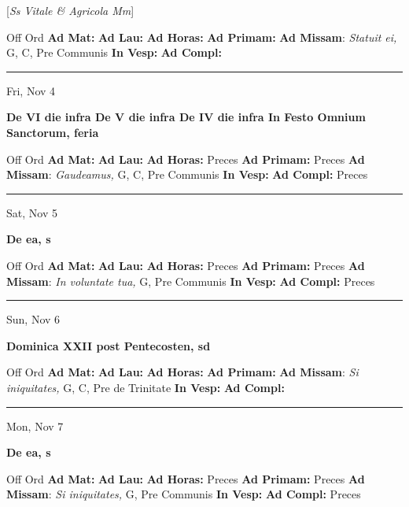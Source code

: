 \documentclass[letterpaper, 10pt]{article}
\begin{document}
[\textit{Ss Vitale \& Agricola Mm}]
\begin{justify}
Off Ord
\textbf{Ad Mat: }
\textbf{Ad Lau: }
\textbf{Ad Horas: }
\textbf{Ad Primam: }
\textbf{Ad Missam}: \textit{Statuit ei,} G, C, Pre Communis
\textbf{In Vesp: }
\textbf{Ad Compl: }\end{justify}



\hrule
\begin{center}
Fri, Nov 4
\end{center}\textbf{ \large De VI die infra De V die infra De IV die infra In Festo Omnium Sanctorum, \textnormal{\normalsize feria}}
\begin{justify}
Off Ord
\textbf{Ad Mat: }
\textbf{Ad Lau: }
\textbf{Ad Horas: }Preces
\textbf{Ad Primam: }Preces
\textbf{Ad Missam}: \textit{Gaudeamus,} G, C, Pre Communis
\textbf{In Vesp: }
\textbf{Ad Compl: }Preces\end{justify}



\hrule
\begin{center}
Sat, Nov 5
\end{center}\textbf{ \large De ea, \textnormal{\normalsize s}}
\begin{justify}
Off Ord
\textbf{Ad Mat: }
\textbf{Ad Lau: }
\textbf{Ad Horas: }Preces
\textbf{Ad Primam: }Preces
\textbf{Ad Missam}: \textit{In voluntate tua,} G, Pre Communis
\textbf{In Vesp: }
\textbf{Ad Compl: }Preces\end{justify}



\hrule
\begin{center}
Sun, Nov 6
\end{center}\textbf{ \large Dominica XXII post Pentecosten, \textnormal{\normalsize sd}}
\begin{justify}
Off Ord
\textbf{Ad Mat: }
\textbf{Ad Lau: }
\textbf{Ad Horas: }
\textbf{Ad Primam: }
\textbf{Ad Missam}: \textit{Si iniquitates,} G, C, Pre de Trinitate
\textbf{In Vesp: }
\textbf{Ad Compl: }\end{justify}



\hrule
\begin{center}
Mon, Nov 7
\end{center}\textbf{ \large De ea, \textnormal{\normalsize s}}
\begin{justify}
Off Ord
\textbf{Ad Mat: }
\textbf{Ad Lau: }
\textbf{Ad Horas: }Preces
\textbf{Ad Primam: }Preces
\textbf{Ad Missam}: \textit{Si iniquitates,} G, Pre Communis
\textbf{In Vesp: }
\textbf{Ad Compl: }Preces\end{justify}
\end{document}
